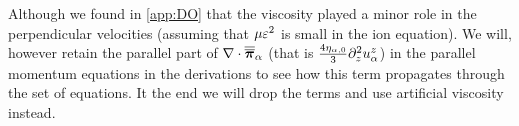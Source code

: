 %
Although we found in \cref{app:DO} that the viscosity played a minor role in the perpendicular velocities (assuming that $\mu \varepsilon^2$ is small in the ion equation).
We will, however retain the parallel part of $\nabla\cdot\boldsymbol{\overline{\overline{\pi}}}_\alpha$ (that is $\frac{4\eta_{\alpha,0}}{3} \partial_z^2 u^{z}_{\alpha}$) in the parallel momentum equations in the derivations to see how this term propagates through the set of equations.
It the end we will drop the terms and use artificial viscosity instead.

